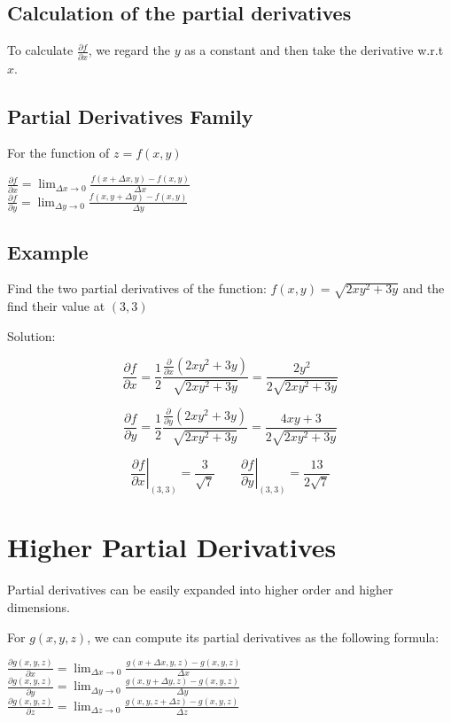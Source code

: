 \documentclass[UTF8,a4paper, 10pt, openany]{svmono}
\begin{document}
\subsection{Calculation of the partial derivatives}
To calculate $\frac{\partial f}{\partial x}$, we regard the $y$ as a constant and then take the derivative w.r.t $x$.
\subsection{Partial Derivatives Family}
For the function of $z=f(x,y)$
\begin{center}
$\frac{\partial f}{\partial x}=\displaystyle\lim_{\Delta x \to 0}\frac{f(x+\Delta x,y)-f(x,y)}{\Delta x}$\\
$\frac{\partial f}{\partial y}=\displaystyle\lim_{\Delta y \to 0}\frac{f(x,y+\Delta y)-f(x,y)}{\Delta y}$
\end{center}

\subsection{Example}
Find the two partial derivatives of the function: $f(x,y)=\sqrt{2xy^2+3y}$ and the find their value at $(3,3)$

Solution:

\[\frac{\partial f}{\partial x}=\frac{1}{2}\frac{\frac{\partial}{\partial x}(2xy^2+3y)}{\sqrt{2xy^2+3y}}=\frac{2y^2}{2\sqrt{2xy^2+3y}}\]

\[\frac{\partial f}{\partial y}=\frac{1}{2}\frac{\frac{\partial}{\partial y}(2xy^2+3y)}{\sqrt{2xy^2+3y}}=\frac{4xy+3}{2\sqrt{2xy^2+3y}}\]

\[\displaystyle\left.\frac{\partial f}{\partial x}\right|_{(3,3)}=\frac{3}{\sqrt{7}}	\qquad \displaystyle\left.\frac{\partial f}{\partial y}\right|_{(3,3)}=\frac{13}{2\sqrt{7}}\]


\section{Higher Partial Derivatives}
Partial derivatives can be easily expanded into higher order and higher dimensions.

For $g(x,y,z)$, we can compute its partial derivatives as the following formula:

\begin{center}
$\frac{\partial g(x,y,z)}{\partial x}=\displaystyle\lim_{\Delta x\to 0} \frac{g(x+\Delta x,y,z)-g(x,y,z)}{\Delta x}$\\
$\frac{\partial g(x,y,z)}{\partial y}=\displaystyle\lim_{\Delta y\to 0} \frac{g(x,y+\Delta y,z)-g(x,y,z)}{\Delta y}$\\
$\frac{\partial g(x,y,z)}{\partial z}=\displaystyle\lim_{\Delta z\to 0} \frac{g(x,y,z+\Delta z)-g(x,y,z)}{\Delta z}$
\end{center}
\end{document}
